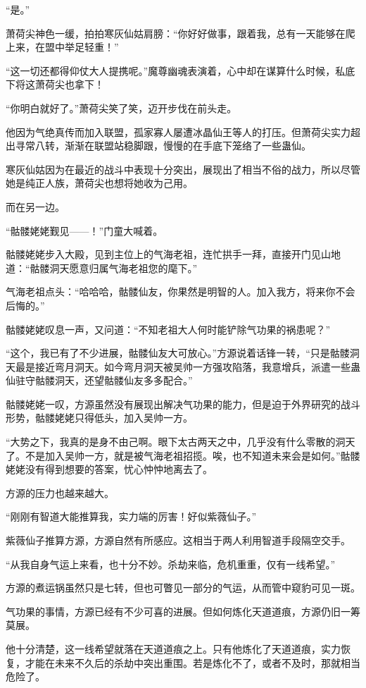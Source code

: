 \begin{this_body}
“是。”

萧荷尖神色一缓，拍拍寒灰仙姑肩膀：“你好好做事，跟着我，总有一天能够在爬上来，在盟中举足轻重！”

“这一切还都得仰仗大人提携呢。”魔尊幽魂表演着，心中却在谋算什么时候，私底下将这萧荷尖也拿下！

“你明白就好了。”萧荷尖笑了笑，迈开步伐在前头走。

他因为气绝真传而加入联盟，孤家寡人屡遭冰晶仙王等人的打压。但萧荷尖实力超出寻常八转，渐渐在联盟站稳脚跟，慢慢的在手底下笼络了一些蛊仙。

寒灰仙姑因为在最近的战斗中表现十分突出，展现出了相当不俗的战力，所以尽管她是纯正人族，萧荷尖也想将她收为己用。

而在另一边。

“骷髅姥姥觐见——！”门童大喊着。

骷髅姥姥步入大殿，见到主位上的气海老祖，连忙拱手一拜，直接开门见山地道：“骷髅洞天愿意归属气海老祖您的麾下。”

气海老祖点头：“哈哈哈，骷髅仙友，你果然是明智的人。加入我方，将来你不会后悔的。”

骷髅姥姥叹息一声，又问道：“不知老祖大人何时能铲除气功果的祸患呢？”

“这个，我已有了不少进展，骷髅仙友大可放心。”方源说着话锋一转，“只是骷髅洞天最是接近弯月洞天。如今弯月洞天被吴帅一方强攻陷落，我意增兵，派遣一些蛊仙驻守骷髅洞天，还望骷髅仙友多多配合。”

骷髅姥姥一叹，方源虽然没有展现出解决气功果的能力，但是迫于外界研究的战斗形势，骷髅姥姥只得低头，加入吴帅一方。

“大势之下，我真的是身不由己啊。眼下太古两天之中，几乎没有什么零散的洞天了。不是加入吴帅一方，就是被气海老祖招揽。唉，也不知道未来会是如何。”骷髅姥姥没有得到想要的答案，忧心忡忡地离去了。

方源的压力也越来越大。

“刚刚有智道大能推算我，实力端的厉害！好似紫薇仙子。”

紫薇仙子推算方源，方源自然有所感应。这相当于两人利用智道手段隔空交手。

“从我自身气运上来看，也十分不妙。杀劫来临，危机重重，仅有一线希望。”

方源的煮运锅虽然只是七转，但也可瞥见一部分的气运，从而管中窥豹可见一斑。

气功果的事情，方源已经有不少可喜的进展。但如何炼化天道道痕，方源仍旧一筹莫展。

他十分清楚，这一线希望就落在天道道痕之上。只有他炼化了天道道痕，实力恢复，才能在未来不久后的杀劫中突出重围。若是炼化不了，或者不及时，那就相当危险了。


\end{this_body}
